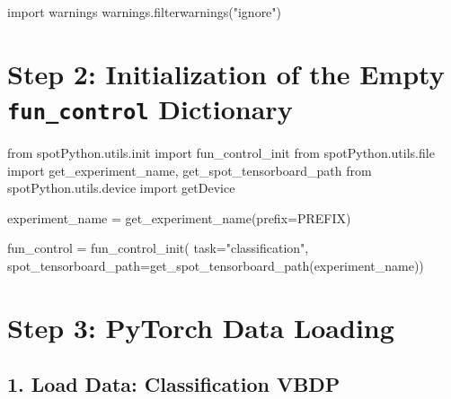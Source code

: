 \documentclass[
  letterpaper,
  DIV=11,
  numbers=noendperiod]{scrreprt}
\newenvironment{Shaded}{\begin{snugshade}}{\end{snugshade}}
\newcommand{\BuiltInTok}[1]{\textcolor[rgb]{0.00,0.23,0.31}{#1}}
\newcommand{\ImportTok}[1]{\textcolor[rgb]{0.00,0.46,0.62}{#1}}
\newcommand{\NormalTok}[1]{\textcolor[rgb]{0.00,0.23,0.31}{#1}}
\newcommand{\OperatorTok}[1]{\textcolor[rgb]{0.37,0.37,0.37}{#1}}
\newcommand{\StringTok}[1]{\textcolor[rgb]{0.13,0.47,0.30}{#1}}
\begin{document}
\begin{Shaded}
\begin{Highlighting}[]
\ImportTok{import}\NormalTok{ warnings}
\NormalTok{warnings.filterwarnings(}\StringTok{"ignore"}\NormalTok{)}
\end{Highlighting}
\end{Shaded}

\hypertarget{step-2-initialization-of-the-empty-fun_control-dictionary-2}{%
\section{\texorpdfstring{Step 2: Initialization of the Empty
\texttt{fun\_control}
Dictionary}{Step 2: Initialization of the Empty fun\_control Dictionary}}\label{step-2-initialization-of-the-empty-fun_control-dictionary-2}}

\begin{Shaded}
\begin{Highlighting}[]
\ImportTok{from}\NormalTok{ spotPython.utils.init }\ImportTok{import}\NormalTok{ fun\_control\_init}
\ImportTok{from}\NormalTok{ spotPython.utils.}\BuiltInTok{file} \ImportTok{import}\NormalTok{ get\_experiment\_name, get\_spot\_tensorboard\_path}
\ImportTok{from}\NormalTok{ spotPython.utils.device }\ImportTok{import}\NormalTok{ getDevice}

\NormalTok{experiment\_name }\OperatorTok{=}\NormalTok{ get\_experiment\_name(prefix}\OperatorTok{=}\NormalTok{PREFIX)}

\NormalTok{fun\_control }\OperatorTok{=}\NormalTok{ fun\_control\_init(}
\NormalTok{    task}\OperatorTok{=}\StringTok{"classification"}\NormalTok{,}
\NormalTok{    spot\_tensorboard\_path}\OperatorTok{=}\NormalTok{get\_spot\_tensorboard\_path(experiment\_name))}
\end{Highlighting}
\end{Shaded}

\hypertarget{sec-data-loading-17}{%
\section{Step 3: PyTorch Data Loading}\label{sec-data-loading-17}}

\hypertarget{load-data-classification-vbdp-1}{%
\subsection{1. Load Data: Classification
VBDP}\label{load-data-classification-vbdp-1}}
\end{document}
